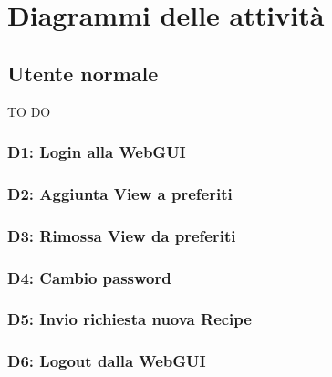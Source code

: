 %
%


\section{Diagrammi delle attività} %
\label{sec:diagrammi_delle_attivita}



\subsection{Utente normale} TO DO

\subsubsection{D1: Login alla WebGUI}
\subsubsection{D2: Aggiunta View a preferiti}
\subsubsection{D3: Rimossa View da preferiti}
\subsubsection{D4: Cambio password}
\subsubsection{D5: Invio richiesta nuova Recipe}
\subsubsection{D6: Logout dalla WebGUI}



